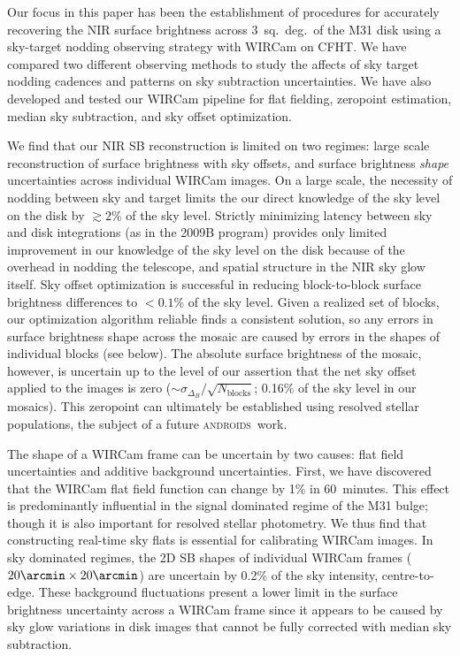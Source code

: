 \documentclass[iop]{emulateapj}
\newcommand{\androids}{\textsc{androids}}
\begin{document}
Our focus in this paper has been the establishment of procedures for accurately recovering the NIR surface brightness across 3~sq.~deg.\ of the M31 disk using a sky-target nodding observing strategy with WIRCam on CFHT\@.
We have compared two different observing methods to study the affects of sky target nodding cadences and patterns on sky subtraction uncertainties.
We have also developed and tested our WIRCam pipeline for flat fielding, zeropoint estimation, median sky subtraction, and sky offset optimization.

We find that our NIR SB reconstruction is limited on two regimes: large scale reconstruction of surface brightness with sky offsets, and surface brightness \emph{shape} uncertainties across individual WIRCam images.
On a large scale, the necessity of nodding between sky and target limits the our direct knowledge of the sky level on the disk by $\gtrsim 2$\% of the sky level.
Strictly minimizing latency between sky and disk integrations (as in the 2009B program) provides only limited improvement in our knowledge of the sky level on the disk because of the overhead in nodding the telescope, and spatial structure in the NIR sky glow itself.
Sky offset optimization is successful in reducing block-to-block surface brightness differences to $<0.1$\% of the sky level.
Given a realized set of blocks, our optimization algorithm reliable finds a consistent solution, so any errors in surface brightness shape across the mosaic are caused by errors in the shapes of individual blocks (see below).
The absolute surface brightness of the mosaic, however, is uncertain up to the level of our assertion that the net sky offset applied to the images is zero ($\sim \sigma_{\Delta_B} / \sqrt{N_\mathrm{blocks}}$; 0.16\% of the sky level in our mosaics).
This zeropoint can ultimately be established using resolved stellar populations, the subject of a future \androids\ work.

The shape of a WIRCam frame can be uncertain by two causes: flat field uncertainties and additive background uncertainties.
First, we have discovered that the WIRCam flat field function can change by 1\% in 60~minutes.
This effect is predominantly influential in the signal dominated regime of the M31 bulge; though it is also important for resolved stellar photometry.
We thus find that constructing real-time sky flats is essential for calibrating WIRCam images.
In sky dominated regimes, the 2D SB shapes of individual WIRCam frames ($20\arcmin\times20\arcmin$) are uncertain by 0.2\% of the sky intensity, centre-to-edge.
These background fluctuations present a lower limit in the surface brightness uncertainty across a WIRCam frame since it appears to be caused by sky glow variations in disk images that cannot be fully corrected with median sky subtraction.
\end{document}
